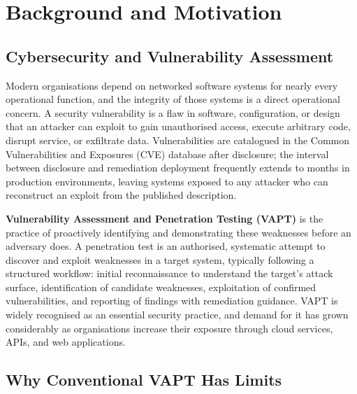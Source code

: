 \section{Background and Motivation}
\label{sec:intro_background}

\subsection{Cybersecurity and Vulnerability Assessment}

Modern organisations depend on networked software systems for nearly every operational function, and the integrity of those systems is a direct operational concern. A security vulnerability is a flaw in software, configuration, or design that an attacker can exploit to gain unauthorised access, execute arbitrary code, disrupt service, or exfiltrate data. Vulnerabilities are catalogued in the Common Vulnerabilities and Exposures (CVE) database after disclosure; the interval between disclosure and remediation deployment frequently extends to months in production environments, leaving systems exposed to any attacker who can reconstruct an exploit from the published description.

\textbf{Vulnerability Assessment and Penetration Testing (VAPT)} is the practice of proactively identifying and demonstrating these weaknesses before an adversary does. A penetration test is an authorised, systematic attempt to discover and exploit weaknesses in a target system, typically following a structured workflow: initial reconnaissance to understand the target's attack surface, identification of candidate weaknesses, exploitation of confirmed vulnerabilities, and reporting of findings with remediation guidance. VAPT is widely recognised as an essential security practice, and demand for it has grown considerably as organisations increase their exposure through cloud services, APIs, and web applications.

\subsection{Why Conventional VAPT Has Limits}

